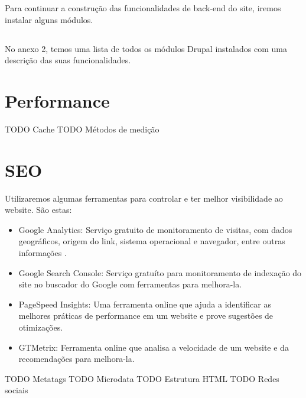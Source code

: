 Para continuar a construção das funcionalidades de back-end do site, iremos instalar alguns módulos.

\subsection{}



No anexo 2, temos uma lista de todos os módulos Drupal instalados com uma descrição das suas funcionalidades.

\section{Performance}



TODO Cache
TODO Métodos de medição

\section{SEO}

Utilizaremos algumas ferramentas para controlar e ter melhor visibilidade ao website. São estas:

\begin{itemize}
  \item Google Analytics: Serviço gratuito de monitoramento de visitas, com dados geográficos, origem do link, sistema operacional e navegador, entre outras informações \cite{Analytics}.
  \item Google Search Console: Serviço gratuíto para monitoramento de indexação do site no buscador do Google com ferramentas para melhora-la. 
  \item PageSpeed Insights: Uma ferramenta online que ajuda a identificar as melhores práticas de performance em um website e prove sugestões de otimizações.
  \item GTMetrix: Ferramenta online que analisa a velocidade de um website e da recomendações para melhora-la.
\end{itemize}

TODO Metatags
TODO Microdata
TODO Estrutura HTML
TODO Redes sociais

